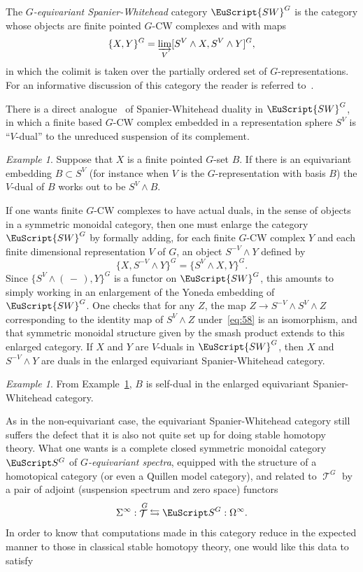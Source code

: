 \documentclass{amsart}
\theoremstyle{definition}
\theoremstyle{remark}
\newtheorem{eg}[equation]{Example}
\newcommand{\slot}{\,-\,}
\newcommand{\spectra}{\EuScript S}
\newcommand{\swg}[1]{\EuScript {SW}^{#1}}
\DeclareMathOperator{\spaces}{\mathcal T}
\newcommand{\ugspaces}[1]{\spaces^{#1}}
\newcommand{\ugspectra}[1]{\spectra^{#1}}
\begin{document}
The {\em $G$-equivariant Spanier-Whitehead} category $\swg{G}$ is the
category whose objects are finite pointed $G$-CW complexes and with
maps
\[
\{X,Y \}^{G} = \varinjlim_{V}[S^{V}\wedge X,S^{V}\wedge Y]^{G},
\]
in which the colimit is taken over the partially ordered set of
$G$-representations.  For an informative discussion of this category
the reader is referred to~\cite{MR764596}.

There is a direct analogue~\cite{MR764596,MR0343260} of
Spanier-Whitehead duality in $\swg{G}$, in which a finite based $G$-CW
complex embedded in a representation sphere $S^{V}$ is ``$V$-dual'' to
the unreduced suspension of its complement.

\begin{eg}
\label{eg:27} Suppose that $X$ is a finite pointed $G$-set $B$.  If
there is an equivariant embedding $B\subset S^{V}$ (for instance when
$V$ is the $G$-representation with basis $B$) the $V$-dual of $B$
works out to be $S^{V}\wedge B$.
\end{eg}

If one wants finite $G$-CW complexes to have actual duals, in the
sense of objects in a symmetric monoidal category, then one must
enlarge the category $\swg{G}$ by formally adding, for each finite
$G$-CW complex $Y$ and each finite dimensional representation $V$ of
$G$, an object $S^{-V}\wedge Y$ defined by
\begin{equation}
\label{eq:58}
\{X,S^{-V}\wedge Y \}^{G} = 
\{S^{V}\wedge X,Y \}^{G}.
\end{equation}
Since $\{S^{V}\wedge (\slot),Y \}^{G}$ is a functor on $\swg{G}$, this
amounts to simply working in an enlargement of the Yoneda embedding of
$\swg{G}$.  One checks that for any $Z$, the map $Z\to S^{-V}\wedge
S^{V}\wedge Z$ corresponding to the identity map of $S^{V}\wedge Z$
under~\eqref{eq:58} is an isomorphism, and that symmetric monoidal
structure given by the smash product extends to this enlarged
category.   If $X$ and $Y$ are $V$-duals in $\swg{G}$, then $X$ and
$S^{-V}\wedge Y$ are duals in the enlarged equivariant
Spanier-Whitehead category. 

\begin{eg}
\label{eg:28}
From Example~\ref{eg:27}, $B$ is self-dual in the enlarged equivariant
Spanier-Whitehead category.
\end{eg}

As in the non-equivariant case, the equivariant Spanier-Whitehead
category still suffers the defect that it is also not quite set up for
doing stable homotopy theory.  What one wants is a complete closed
symmetric monoidal category $\ugspectra{G}$ of {\em $G$-equivariant
spectra}, equipped with the structure of a homotopical category (or
even a Quillen model category), and related to $\ugspaces{G}$ by a
pair of adjoint (suspension spectrum and zero space) functors
\[
\Sigma^{\infty}:\ugspaces{G} \leftrightarrows \ugspectra{G}: \Omega^{\infty}.
\]
In order to know that computations made in this category reduce in the
expected manner to those in classical stable homotopy theory, one
would like this data to satisfy
\end{document}
